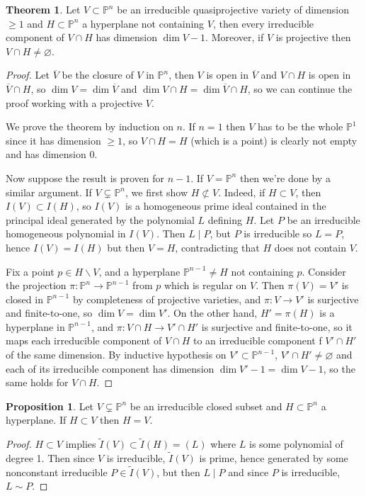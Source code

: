 \documentclass{article}
\newcommand{\p}{\mathbb{P}}
\theoremstyle{definition}
\newtheorem{prop}[defn]{Proposition}
\newtheorem{thm}[defn]{Theorem}
\begin{document}
\begin{thm}
\label{thm:dimofintwithhp}
Let $V\subset\p^n$ be an irreducible quasiprojective variety of dimension $\geq 1$ and $H\subset\p^n$ a hyperplane not containing $V$, then every irreducible component of $V\cap H$ has dimension $\dim V-1$. Moreover, if $V$ is projective then $V\cap H\neq\varnothing$.
\end{thm}
\begin{proof}
Let $\overline V$ be the closure of $V$ in $\p^n$, then $V$ is open in $\overline V$ and $V\cap H$ is open in $\overline V\cap H$, so $\dim V=\dim\overline V$ and $\dim V\cap H=\dim\overline V\cap H$, so we can continue the proof working with a projective $V$.

We prove the theorem by induction on $n$. If $n=1$ then $V$ has to be the whole $\p^1$ since it has dimension $\geq 1$, so $V\cap H=H$ (which is a point) is clearly not empty and has dimension 0.

Now suppose the result is proven for $n-1$. If $V=\p^n$ then we're done by a similar argument. If $V\subsetneq\p^n$, we first show $H\not\subset V$. Indeed, if $H\subset V$, then $I(V)\subset I(H)$, so $I(V)$ is a homogeneous prime ideal contained in the principal ideal generated by the polynomial $L$ defining $H$. Let $P$ be an irreducible homogeneous polynomial in $I(V)$. Then $L\mid P$, but $P$ is irreducible so $L=P$, hence $I(V)=I(H)$ but then $V=H$, contradicting that $H$ does not contain $V$.

Fix a point $p\in H\backslash V$, and a hyperplane $\p^{n-1}\neq H$ not containing $p$. Consider the projection $\pi:\p^n\rightarrow\p^{n-1}$ from $p$ which is regular on $V$. Then $\pi(V)=V'$ is closed in $\p^{n-1}$ by completeness of projective varieties, and $\pi:V\rightarrow V'$ is surjective and finite-to-one, so $\dim V=\dim V'$. On the other hand, $H'=\pi(H)$ is a hyperplane in $\p^{n-1}$, and $\pi:V\cap H\rightarrow V'\cap H'$ is surjective and finite-to-one, so it maps each irreducible component of $V\cap H$ to an irreducible component f $V'\cap H'$ of the same dimension. By inductive hypothesis on $V'\subset\p^{n-1}$, $V'\cap H'\neq\varnothing$ and each of its irreducible component has dimension $\dim V'-1=\dim V-1$, so the same holds for $V\cap H$.
\end{proof}

\begin{prop}
Let $V\subsetneq\p^n$ be an irreducible closed subset and $H\subset\p^n$ a hyperplane. If $H\subset V$ then $H=V$.
\end{prop}
\begin{proof}
$H\subset V$ implies $\widetilde I(V)\subset\widetilde I(H)=(L)$ where $L$ is some polynomial of degree 1. Then since $V$ is irreducible, $\widetilde I(V)$ is prime, hence generated by some nonconstant irreducible $P\in\widetilde I(V)$, but then $L\mid P$ and since $P$ is irreducible, $L\sim P$. 
\end{proof}
\end{document}
